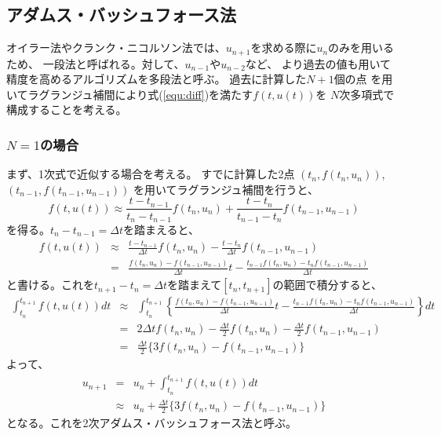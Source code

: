 \documentclass[a4j, titlepage]{jsarticle}
\numberwithin{equation}{section}
\begin{document}
    \subsection{アダムス・バッシュフォース法}
        オイラー法やクランク・ニコルソン法では、$u_{n+1}$を求める際に$u_{n}$のみを用いるため、
        一段法と呼ばれる。対して、$u_{n-1}$や$u_{n-2}$など、
        より過去の値も用いて精度を高めるアルゴリズムを多段法と呼ぶ。
        過去に計算した$N+1$個の点
        を用いてラグランジュ補間により式(\ref{equ:diff})を満たす$f(t, u(t))$を
        $N$次多項式で構成することを考える。

        \subsubsection{$N=1$の場合}
            まず、1次式で近似する場合を考える。
            すでに計算した2点
            $(t_n, f(t_n, u_n))$,
            $(t_{n-1}, f(t_{n-1}, u_{n-1}))$
            を用いてラグランジュ補間を行うと、
            \begin{equation*}
                f(t, u(t)) \approx \frac{t - t_{n-1}}{t_n - t_{n-1}}f(t_n, u_n) + \frac{t - t_n}{t_{n-1} - t_n}f(t_{n-1}, u_{n-1})
            \end{equation*}
            を得る。$t_n - t_{n-1} = \Delta t$を踏まえると、
            \begin{eqnarray*}
                f(t, u(t)) &\approx& \frac{t - t_{n-1}}{\Delta t}f(t_n, u_n) - \frac{t - t_n}{\Delta t}f(t_{n-1}, u_{n-1}) \\
                &=& \frac{f(t_n, u_n) - f(t_{n-1}, u_{n-1})}{\Delta t}t - \frac{t_{n-1}f(t_n, u_n) - t_nf(t_{n-1}, u_{n-1})}{\Delta t}
            \end{eqnarray*}
            と書ける。これを$t_{n+1} - t_{n} = \Delta t$を踏まえて$[t_n, t_{n+1}]$の範囲で積分すると、
            \begin{eqnarray*}
                \int^{t_{n+1}}_{t_n} f(t, u(t)) dt &\approx& \int^{t_{n+1}}_{t_n} \left\{ \frac{f(t_n, u_n) - f(t_{n-1}, u_{n-1})}{\Delta t}t - \frac{t_{n-1}f(t_n, u_n) - t_nf(t_{n-1}, u_{n-1})}{\Delta t} \right\} dt \\
                &=& 2\Delta t f(t_n, u_n) - \frac{\Delta t}{2} f(t_n, u_n) - \frac{\Delta t}{2} f(t_{n-1}, u_{n-1}) \\
                &=& \frac{\Delta t}{2} \{3f(t_n, u_n) - f(t_{n-1}, u_{n-1})\}
            \end{eqnarray*}
            よって、
            \begin{eqnarray}
                u_{n+1} &=& u_n + \int^{t_{n+1}}_{t_n} f(t, u(t)) dt \nonumber \\
                &\approx& u_n + \frac{\Delta t}{2} \{3f(t_n, u_n) - f(t_{n-1}, u_{n-1})\}
            \end{eqnarray}
            となる。これを2次アダムス・バッシュフォース法と呼ぶ。
\end{document}
